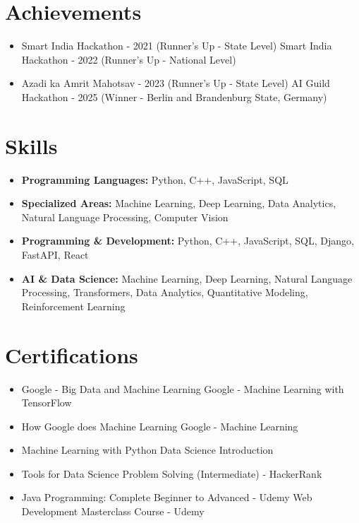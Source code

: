 \documentclass[a4paper,10pt]{article}
\begin{document}
\section*{Achievements}
\begin{itemize}
\item Smart India Hackathon - 2021 (Runner's Up - State Level) \hfill Smart India Hackathon - 2022 (Runner's Up - National Level)
\item Azadi ka Amrit Mahotsav - 2023 (Runner's Up - State Level) \hfill AI Guild Hackathon - 2025 (Winner - Berlin and Brandenburg State, Germany)
\end{itemize}

\section*{Skills}
\begin{itemize}
  \item \textbf{Programming Languages:} Python, C++, JavaScript, SQL
  \item \textbf{Specialized Areas:} Machine Learning, Deep Learning, Data Analytics, Natural Language Processing, Computer Vision
  \item \textbf{Programming \& Development:} Python, C++, JavaScript, SQL, Django, FastAPI, React
  \item \textbf{AI \& Data Science:} Machine Learning, Deep Learning, Natural Language Processing, Transformers, Data Analytics, Quantitative Modeling, Reinforcement Learning
\end{itemize}

\section*{Certifications}
\begin{itemize}
\item Google - Big Data and Machine Learning \hfill Google - Machine Learning with TensorFlow
\item How Google does Machine Learning \hfill Google - Machine Learning
\item Machine Learning with Python \hfill Data Science Introduction
\item Tools for Data Science \hfill Problem Solving (Intermediate) - HackerRank
\item Java Programming: Complete Beginner to Advanced - Udemy \hfill Web Development Masterclass Course - Udemy
\end{itemize}
\end{document}
